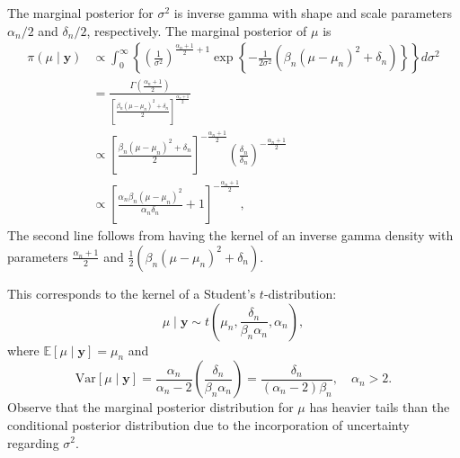 \begin{enumerate}
The marginal posterior for $\sigma^2$ is inverse gamma with shape and scale parameters $\alpha_n/2$ and $\delta_n/2$, respectively. The marginal posterior of $\mu$ is
\begin{align}
	\pi(\mu\mid \bm{y})&\propto \int_{0}^{\infty}\left\{ \left(\frac{1}{\sigma^2}\right)^{\frac{\alpha_n+1}{2}+1}\exp\left\{-\frac{1}{2\sigma^2}(\beta_n(\mu-\mu_n)^2+\delta_n)\right\}\right\}d\sigma^2\nonumber\\
	&=\frac{\Gamma\left(\frac{\alpha_n+1}{2}\right)}{\left[\frac{\beta_n(\mu-\mu_n)^2+\delta_n}{2}\right]^{\frac{\alpha_n+1}{2}}}\nonumber\\
	&\propto \left[\frac{\beta_n(\mu-\mu_n)^2+\delta_n}{2}\right]^{-\frac{\alpha_n+1}{2}}\left(\frac{\delta_n}{\delta_n}\right)^{-\frac{\alpha_n+1}{2}}\nonumber\\
	&\propto \left[\frac{\alpha_n\beta_n(\mu-\mu_n)^2}{\alpha_n\delta_n}+1\right]^{-\frac{\alpha_n+1}{2}},\nonumber
\end{align}
The second line follows from having the kernel of an inverse gamma density with parameters \( \frac{\alpha_n + 1}{2} \) and \( \frac{1}{2} \left( \beta_n (\mu - \mu_n)^2 + \delta_n \right) \).

This corresponds to the kernel of a Student's \( t \)-distribution:
\[
\mu \mid \bm{y} \sim t\left(\mu_n, \frac{\delta_n}{\beta_n \alpha_n}, \alpha_n\right),
\]
where \( \mathbb{E}[\mu \mid \bm{y}] = \mu_n \) and 
\[
\text{Var}[\mu \mid \bm{y}] = \frac{\alpha_n}{\alpha_n - 2} \left( \frac{\delta_n}{\beta_n \alpha_n} \right) = \frac{\delta_n}{(\alpha_n - 2) \beta_n}, \quad \alpha_n > 2.
\]
Observe that the marginal posterior distribution for \( \mu \) has heavier tails than the conditional posterior distribution due to the incorporation of uncertainty regarding \( \sigma^2 \).


\end{enumerate}
